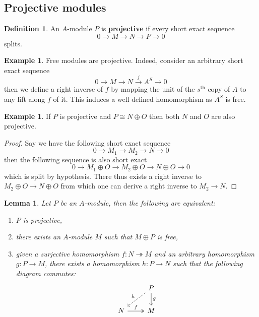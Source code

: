 \documentclass[12pt]{article}
\theoremstyle{plain}
\newtheorem{lemma}[thm]{Lemma}
\theoremstyle{definition}
\newtheorem{defn}[thm]{Definition} %
\newtheorem{example}[thm]{Example}
\newcommand{\lto}{\longrightarrow}
\begin{document}
\subsection{Projective modules}\label{Sec:proj_mod}
\begin{defn}
An $A$-module $P$ is \textbf{projective} if every short exact sequence
\begin{equation}
0 \lto M \lto N \lto P \lto 0
\end{equation}
splits.
\end{defn}
\begin{example}\label{ex:free_split}
Free modules are projective. Indeed, consider an arbitrary short exact sequence
\begin{equation}
0 \lto M \lto N \stackrel{f}{\lto} A^S \lto 0
\end{equation}
then we define a right inverse of $f$ by mapping the unit of the $s^{\text{th}}$ copy of $A$ to any lift along $f$ of it. This induces a well defined homomorphism as $A^S$ is free.
\end{example}
\begin{example}\label{ex:summands_proj}
If $P$ is projective and $P \cong N \oplus O$ then both $N$ and $O$ are also projective.
\end{example}
\begin{proof}
Say we have the following short exact sequence
\begin{equation}
0 \lto M_1 \lto M_2 \lto N \lto 0
\end{equation}
then the following sequence is also short exact
\begin{equation}
0 \lto M_1 \oplus O \lto M_2 \oplus O \lto N \oplus O \lto 0
\end{equation}
which is split by hypothesis. There thus exists a right inverse to $M_2 \oplus O \lto N \oplus O$ from which one can derive a right inverse to $M_2 \lto N$.
\end{proof}
\begin{lemma}
Let $P$ be an $A$-module, then the following are equivalent:
\begin{enumerate}
\item\label{lem:projective} $P$ is projective,
\item\label{lem:summand} there exists an $A$-module $M$ such that $M \oplus P$ is free,
\item\label{lem:lift} given a surjective homomorphism $f: N \twoheadrightarrow M$ and an arbitrary homomorphism $g: P \lto M$, there exists a homomorphism $h: P \lto N$ such that the following diagram commutes:
\begin{equation}
\begin{tikzcd}
& P\arrow[dl,swap,dashed,"{h}"]\arrow[d,"{g}"]\\
N\arrow[r,twoheadrightarrow,"{f}"] & M
\end{tikzcd}
\end{equation}
\end{enumerate}
\end{lemma}
\end{document}
